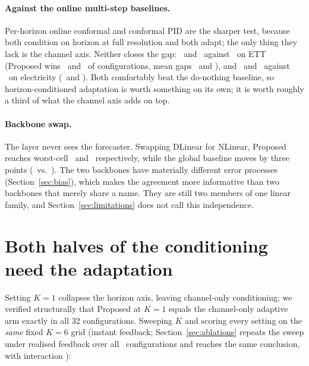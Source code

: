 \documentclass[11pt]{article}
\begin{document}
\paragraph{Against the online multi-step baselines.} Per-horizon online conformal and conformal PID are the sharper test, because both condition on horizon at full resolution and both adapt; the only thing they lack is the channel axis. Neither closes the gap: \obettMSCPonWorst\ and \obettPIDWorst\ against \ettPropDWorst\ on ETT (Proposed wins \obettPropBeatsMSCPon\ and \obettPropBeatsPID\ of configurations, mean gaps \obettPropGapOverMSCPon\ and \obettPropGapOverPID), and \obeclMSCPonWorst\ and \obeclPIDWorst\ against \eclPropDWorst\ on electricity (\obeclPropBeatsMSCPon\ and \obeclPropBeatsPID). Both comfortably beat the do-nothing baseline, so horizon-conditioned adaptation is worth something on its own; it is worth roughly a third of what the channel axis adds on top.

\paragraph{Backbone swap.} The layer never sees the forecaster. Swapping DLinear for NLinear, Proposed reaches worst-cell \ettPropDWorstDLinear\ and \ettPropDWorstNLinear\ respectively, while the global baseline moves by three points (\ettGlobalWorstDLinear\ vs.\ \ettGlobalWorstNLinear). The two backbones have materially different error processes (Section~\ref{sec:bias}), which makes the agreement more informative than two backbones that merely share a name. They are still two members of one linear family, and Section~\ref{sec:limitations} does not call this independence.

\section{Both halves of the conditioning need the adaptation}\label{sec:frailty}

Setting $K = 1$ collapses the horizon axis, leaving channel-only conditioning; we verified structurally that Proposed at $K = 1$ equals the channel-only adaptive arm exactly in all 32 configurations. Sweeping $K$ and scoring every setting on the \emph{same} fixed $K = 6$ grid (instant feedback; Section~\ref{sec:ablations} repeats the sweep under realised feedback over all \ablNumConfigs\ configurations and reaches the same conclusion, with interaction \ablKInteraction):
\end{document}
